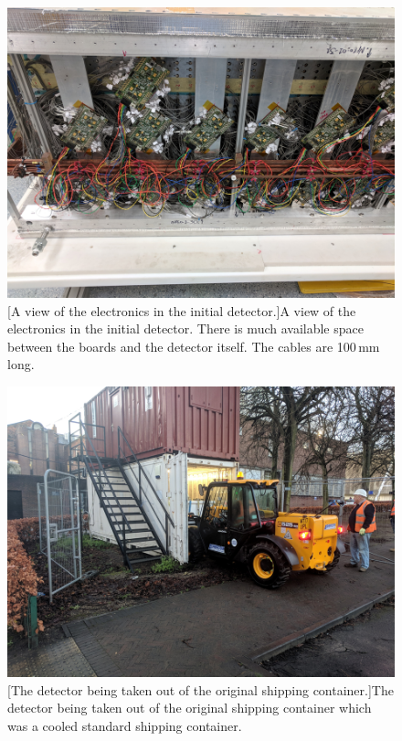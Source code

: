 \begin{figure}[!h]
\centering
\begin{minipage}{.45\textwidth}
  \centering
  \includegraphics[width=\linewidth]{Chapter3/Figs/Raster/detCon002_OldTearAway.png}
  [A view of the electronics in the initial detector.]{A view of the electronics in the initial detector. There is much available space between the boards and the detector itself. The cables are 100\,mm long.} 
  \label{fig:detCon002_OldTearAway}
\end{minipage}%
\qquad
\begin{minipage}{.45\textwidth}
  \centering
  \includegraphics[width=\linewidth]{Chapter3/Figs/Raster/detCon000_TakeOut1.png} 
  [The detector being taken out of the original shipping container.]{The detector being taken out of the original shipping container which was a cooled standard shipping container.}
  \label{fig:detCon000_TakeOut1}
  \vspace{0.478cm} %
\end{minipage}
\end{figure}

